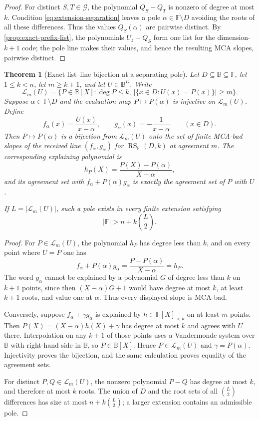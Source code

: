 \documentclass[11pt,a4paper]{amsart}
\numberwithin{equation}{section}
\newtheorem{theorem}{Theorem}[section]
\theoremstyle{remark}
\DeclareMathOperator{\RS}{RS}
\newcommand{\F}{\mathbb F}
\newcommand{\B}{\mathbb B}
\newcommand{\Lcal}{\mathcal L}
\newcommand{\abs}[1]{\lvert #1\rvert}
\begin{document}
\begin{proof}
For distinct \(S,T\in\mathcal G\), the polynomial \(Q_S-Q_T\) is nonzero
of degree at most \(k\).  Condition \eqref{eq:extension-separation} leaves a
pole \(\alpha\in\F\setminus D\) avoiding the roots of all these
differences.  Thus the values \(Q_S(\alpha)\) are pairwise distinct.  By
\cref{prop:exact-prefix-list}, the polynomials \(U_z-Q_S\) form one list for
the dimension-\(k+1\) code; the pole line makes their values, and hence the
resulting MCA slopes, pairwise distinct.
\end{proof}

\begin{theorem}[Exact list--line bijection at a separating pole]
\label{thm:exact-list-line-bijection}
Let \(D\subseteq\B\subseteq\F\), let \(1\le k<n\), let \(m\ge k+1\),
and let \(U\in\B^D\).  Write
\[
 \Lcal_m(U)=\{P\in\B[X]:\deg P\le k,
       \ \abs{\{x\in D:U(x)=P(x)\}}\ge m\}.
\]
Suppose \(\alpha\in\F\setminus D\) and the evaluation map
\(P\mapsto P(\alpha)\) is injective on \(\Lcal_m(U)\).  Define
\[
 f_\alpha(x)=\frac{U(x)}{x-\alpha},\qquad
 g_\alpha(x)=-\frac1{x-\alpha}\qquad(x\in D).
\]
Then \(P\mapsto P(\alpha)\) is a bijection from \(\Lcal_m(U)\) onto
the set of finite MCA-bad slopes of the received line
\((f_\alpha,g_\alpha)\) for \(\RS_\F(D,k)\) at agreement \(m\).  The
corresponding explaining polynomial is
\[
       h_P(X)=\frac{P(X)-P(\alpha)}{X-\alpha},
\]
and its agreement set with
\(f_\alpha+P(\alpha)g_\alpha\) is exactly the agreement set of \(P\)
with \(U\).

If \(L=\abs{\Lcal_m(U)}\), such a pole exists in every finite extension
satisfying
\[
       \abs\F>n+k\binom L2.                         \tag{4.6}
\]
\end{theorem}

\begin{proof}
For \(P\in\Lcal_m(U)\), the polynomial \(h_P\) has degree less than
\(k\), and on every point where \(U=P\) one has
\[
 f_\alpha+P(\alpha)g_\alpha
   =\frac{P-P(\alpha)}{X-\alpha}=h_P.
\]
The word \(g_\alpha\) cannot be explained by a polynomial \(G\) of degree
less than \(k\) on \(k+1\) points, since then
\((X-\alpha)G+1\) would have degree at most \(k\), at least \(k+1\)
roots, and value one at \(\alpha\).  Thus every displayed slope is
MCA-bad.

Conversely, suppose \(f_\alpha+\gamma g_\alpha\) is explained by
\(h\in\F[X]_{<k}\) on at least \(m\) points.  Then
\(P(X)=(X-\alpha)h(X)+\gamma\) has degree at most \(k\) and agrees with
\(U\) there.  Interpolation on any \(k+1\) of those points uses a
Vandermonde system over \(\B\) with right-hand side in \(\B\), so
\(P\in\B[X]\).  Hence \(P\in\Lcal_m(U)\) and
\(\gamma=P(\alpha)\).  Injectivity proves the bijection, and the same
calculation proves equality of the agreement sets.

For distinct \(P,Q\in\Lcal_m(U)\), the nonzero polynomial \(P-Q\) has
degree at most \(k\), and therefore at most \(k\) roots.  The union of
\(D\) and the root sets of all \(\binom L2\) differences has size at most
\(n+k\binom L2\); a larger extension contains an admissible pole.
\end{proof}
\end{document}
